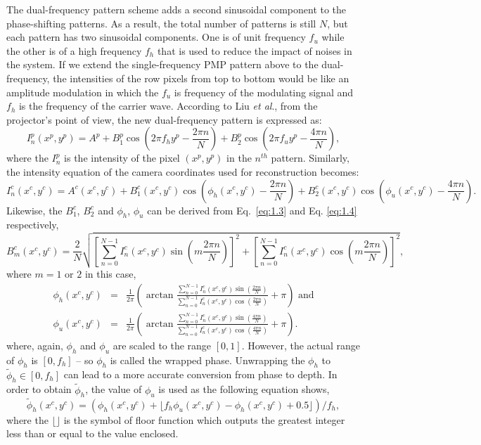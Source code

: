 \documentclass[]{spie}  %
\begin{document}
The dual-frequency pattern scheme adds a second sinusoidal component to the phase-shifting patterns. As a result, the total number of patterns is still $N$, but each pattern has two sinusoidal components. One is of unit frequency $f_u$ while the other is of a high frequency $f_h$ that is used to reduce the impact of noises in the system. If we extend the single-frequency PMP pattern above to the dual-frequency, the intensities of the row pixels from top to bottom would be like an amplitude modulation in which the $f_u$ is frequency of the modulating signal and $f_h$ is the frequency of the carrier wave. According to Liu \textit{et al}., from the projector's point of view, the new dual-frequency pattern is expressed as:
\begin{equation} \label{eq:1.5}
I^p_n(x^p, y^p) = A^p + B^p_1\cos\left(2\pi f_h y^p - \frac{2\pi n}{N}\right) + B^p_2\cos\left(2\pi f_u y^p - \frac{4\pi n}{N}\right),
\end{equation}
where the $I^p_n$ is the intensity of the pixel $(x^p, y^p)$ in the $n^{th}$ pattern. Similarly, the intensity equation of the camera coordinates used for reconstruction becomes:
\begin{equation} \label{eq:1.6}
I^c_n(x^c, y^c) =  A^c(x^c, y^c) + B^c_1(x^c, y^c)\cos\left(\phi_h(x^c, y^c) - \frac{2\pi n}{N}\right) + B^c_2(x^c, y^c)\cos\left(\phi_u(x^c, y^c) - \frac{4\pi n}{N}\right).
\end{equation}
Likewise, the $B^c_1$, $B^c_2$ and $\phi_h$, $\phi_u$ can be derived from Eq.~\eqref{eq:1.3} and Eq. \eqref{eq:1.4} respectively,
\begin{equation} \label{eq:1.7}
B^c_m(x^c, y^c) = \frac{2}{N}\sqrt{\left[\sum_{n=0}^{N-1}I_n^c(x^c, y^c)\sin (m\frac{2\pi n}{N})\right]^2 + \left[\sum_{n=0}^{N-1}I_n^c(x^c, y^c)\cos (m\frac{2\pi n}{N})\right]^2},
\end{equation}
where $m = 1$ or $2$ in this case,
\begin{eqnarray}
\phi_h (x^c, y^c) & = & \frac{1}{2\pi}\left(\arctan \frac{\sum_{n=0}^{N-1} I^c_n(x^c, y^c)\sin(\frac{2\pi n}{N})}{\sum_{n=0}^{N-1} I^c_n(x^c, y^c)\cos(\frac{2\pi n}{N})} + \pi\right) \mbox{ and} \label{eq:1.8} \\
\phi_u (x^c, y^c) & = & \frac{1}{2\pi}\left(\arctan \frac{\sum_{n=0}^{N-1} I^c_n(x^c, y^c)\sin(\frac{4\pi n}{N})}{\sum_{n=0}^{N-1} I^c_n(x^c, y^c)\cos(\frac{4\pi n}{N})} + \pi\right). \label{eq:1.9}
\end{eqnarray}
where, again, $\phi_h$ and $\phi_u$ are scaled to the range $[0, 1]$. However, the actual range of $\phi_h$ is $[0, f_h]$ -- so $\phi_h$ is called the wrapped phase. Unwrapping the $\phi_h$ to $\tilde{\phi}_h \in [0, f_h]$ can lead to a more accurate conversion from phase to depth.  In order to obtain $\tilde{\phi}_h$, the value of $\phi_u$ is used as the following equation shows,
\begin{equation} \label{eq:1.10}
\tilde{\phi}_h(x^c, y^c) = \left( \phi_h(x^c, y^c) + \lfloor f_h \phi_u(x^c, y^c) - \phi_h(x^c, y^c) + 0.5 \rfloor \right)/f_h,
\end{equation}
where the $\lfloor \rfloor$ is the symbol of floor function which outputs the greatest integer less than or equal to the value enclosed.
\end{document}
